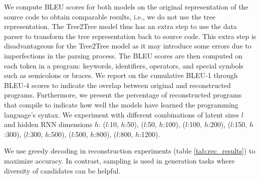 We compute BLEU scores \cite{papineni2002bleu} for both models on the original representation of the source code to obtain comparable results, i.e., we do not use the tree representation. The Tree2Tree model thus has an extra step to use the data parser to transform the tree representation back to source code. This extra step is disadvantageous for the Tree2Tree model as it may introduce some errors due to imperfections in the parsing process. The BLEU scores are then computed on each token in a program: keywords, identifiers, operators, and special symbols such as semicolons or braces. We report on the cumulative BLEU-1 through BLEU-4 scores to indicate the overlap between original and reconstructed programs. Furthermore, we present the percentage of reconstructed programs that compile to indicate how well the models have learned the programming language's syntax. We experiment with different combinations of latent sizes $l$ and hidden RNN dimensions $h$:  ($l$:10,  $h$:50), ($l$:50, $h$:100), ($l$:100, $h$:200), ($l$:150, $h$:300), ($l$:300, $h$:500), ($l$:500, $h$:800), ($l$:800, $h$:1200).



We use greedy decoding in reconstruction experiments (table \ref{tab:rec_results}) to maximize accuracy. In contrast, sampling is used in generation tasks where diversity of candidates can be helpful.

